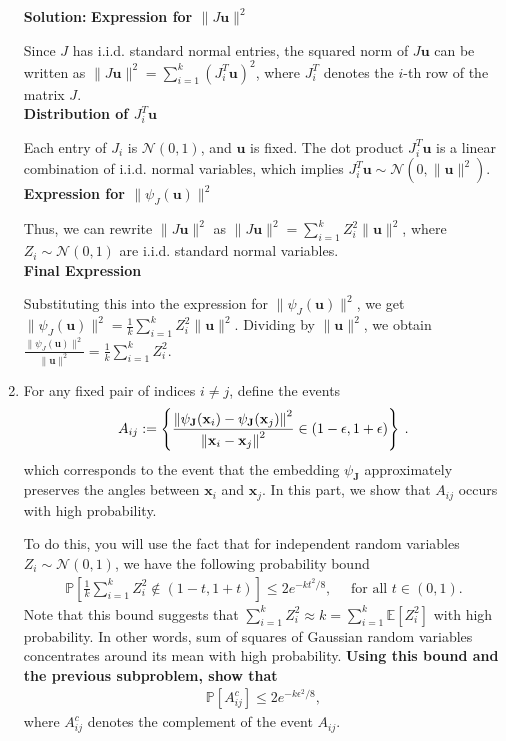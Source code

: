 \documentclass{article}
\newcommand{\mat}[1]{\mathbf{#1}}
\renewcommand{\vec}[1]{\boldsymbol{\mathbf{#1}}}
\newenvironment{solution}{\color{blue} \smallskip \textbf{Solution:}}{}
\begin{document}
\begin{enumerate}
\begin{solution}
\textbf{Expression for \(\|J \mathbf{u}\|^2\)}

Since \(J\) has i.i.d. standard normal entries, the squared norm of \(J \mathbf{u}\) can be written as \(\|J \mathbf{u}\|^2 = \sum_{i=1}^{k} \left( J_i^T \mathbf{u} \right)^2\), where \(J_i^T\) denotes the \(i\)-th row of the matrix \(J\).\\

\textbf{Distribution of \(J_i^T \mathbf{u}\)}

Each entry of \(J_i\) is \(\mathcal{N}(0,1)\), and \(\mathbf{u}\) is fixed. The dot product \(J_i^T \mathbf{u}\) is a linear combination of i.i.d. normal variables, which implies \(J_i^T \mathbf{u} \sim \mathcal{N}(0, \|\mathbf{u}\|^2)\).\\

\textbf{Expression for \(\|\psi_J(\mathbf{u})\|^2\)}

Thus, we can rewrite \(\|J \mathbf{u}\|^2\) as \(\|J \mathbf{u}\|^2 = \sum_{i=1}^{k} Z_i^2 \|\mathbf{u}\|^2\), where \(Z_i \sim \mathcal{N}(0,1)\) are i.i.d. standard normal variables.\\

\textbf{Final Expression}

Substituting this into the expression for \(\|\psi_J(\mathbf{u})\|^2\), we get \(\|\psi_J(\mathbf{u})\|^2 = \frac{1}{k} \sum_{i=1}^{k} Z_i^2 \|\mathbf{u}\|^2\). Dividing by \(\|\mathbf{u}\|^2\), we obtain \(\frac{\|\psi_J(\mathbf{u})\|^2}{\|\mathbf{u}\|^2} = \frac{1}{k} \sum_{i=1}^{k} Z_i^2\).

\end{solution}

\newpage
\item For any fixed pair of indices $i \ne j$, define the events
\[A_{ij} := \left\{\displaystyle\frac{\norm{\psi_{\mat J}(\vec x_i) - \psi_{\mat J}(\vec x_j)}^2}{\norm{\vec x_i - \vec x_j}^2} \in (1-\epsilon, 1+\epsilon) \right\}\:.\]
which corresponds to the event that the embedding $\psi_{\mat J}$ approximately preserves the angles between $\vec x_i$ and $\vec x_j$. In this part, we show that $A_{ij}$ occurs with high probability. 

To do this, you will use the fact that for independent random variables $Z_i \sim \mathcal{N}(0, 1)$, we
have the following probability bound
\begin{align*}
	\mathbb{P}\left[ \frac{1}{k}\sum_{i=1}^k Z_i^2 \notin (1-t, 1+t) \right] \leq 2e^{-kt^2/8}, 
	\quad \text{ for all } t \in (0, 1).
\end{align*}
Note that this bound suggests that $\sum_{i=1}^k Z_i^2 \approx k = \sum_{i=1}^k\mathbb{E}[Z_i^2]$ with high probability.
In other words, sum of squares of Gaussian random variables concentrates around its mean with high probability. {\bf Using this bound and the previous subproblem, show that }
\begin{align*}
		\mathbb{P}\left[ A_{ij}^c \right]\leq 2 e^{-k\epsilon^2/8},
	\end{align*}
	where $A_{ij}^c$ denotes the complement of the event $A_{ij}$.
 

\end{enumerate}
\end{document}
